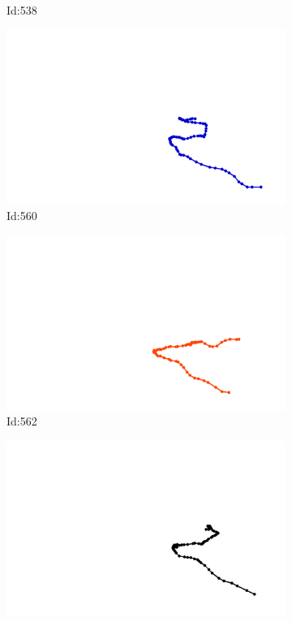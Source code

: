\documentclass[12pt,twoside]{report}
\begin{document}
\begin{figure}
\begin{subfigure}[b]{0.20\textwidth}
\caption{Id:538}
\end{subfigure}
\begin{subfigure}[b]{0.20\textwidth}
\centering
\includegraphics[width=\textwidth]{../trajectories/560.png}
\caption{Id:560}
\end{subfigure}
\begin{subfigure}[b]{0.20\textwidth}
\centering
\includegraphics[width=\textwidth]{../trajectories/562.png}
\caption{Id:562}
\end{subfigure}
\begin{subfigure}[b]{0.20\textwidth}
\centering
\includegraphics[width=\textwidth]{../trajectories/598.png}

\end{subfigure}
\end{figure}
\end{document}
